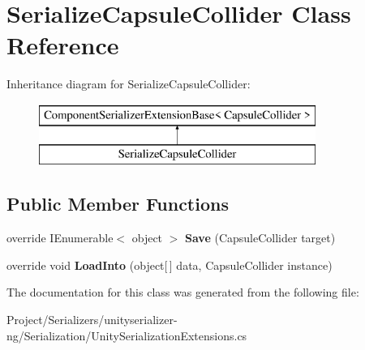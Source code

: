 \hypertarget{class_serialize_capsule_collider}{}\section{Serialize\+Capsule\+Collider Class Reference}
\label{class_serialize_capsule_collider}
Inheritance diagram for Serialize\+Capsule\+Collider\+:\begin{figure}[H]
\begin{center}
\leavevmode
\includegraphics[height=2.000000cm]{class_serialize_capsule_collider}
\end{center}
\end{figure}
\subsection*{Public Member Functions}
\begin{DoxyCompactItemize}
\item 
\mbox{\label{class_serialize_capsule_collider_af02d52a90ac7718fee5f4775c3d441e6}} 
override I\+Enumerable$<$ object $>$ {\bfseries Save} (Capsule\+Collider target)
\item 
\mbox{\label{class_serialize_capsule_collider_ad5551346e6f64d17a17c65349ba4cd68}} 
override void {\bfseries Load\+Into} (object\mbox{[}$\,$\mbox{]} data, Capsule\+Collider instance)
\end{DoxyCompactItemize}


The documentation for this class was generated from the following file\+:\begin{DoxyCompactItemize}
\item 
Project/\+Serializers/unityserializer-\/ng/\+Serialization/Unity\+Serialization\+Extensions.\+cs\end{DoxyCompactItemize}

